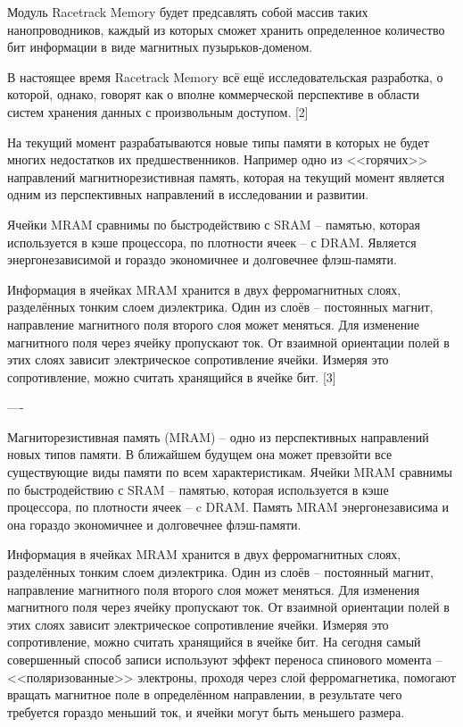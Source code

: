 Модуль Racetrack Memory будет предсавлять собой массив таких 
нанопроводников, каждый из которых сможет хранить определенное количество 
бит информации в виде магнитных пузырьков-доменом. 

В настоящее время Racetrack Memory всё ещё исследовательская разработка, 
о которой, однако, говорят как о вполне коммерческой перспективе в области 
систем хранения данных с произвольным доступом. [2]

На текущий момент разрабатываются новые типы памяти в которых не будет 
многих недостатков их предшественников. Например одно из <<горячих>> 
направлений магнитнорезистивная память, которая на текущий момент 
является одним из перспективных направлений в исследовании и развитии.

Ячейки MRAM сравнимы по быстродействию с SRAM -- памятью, которая 
используется в кэше процессора, по плотности ячеек -- с DRAM. Является 
энергонезависимой и гораздо экономичнее и долговечнее флэш-памяти.

Информация в ячейках MRAM хранится в двух ферромагнитных слоях, 
разделённых тонким слоем диэлектрика. Один из слоёв -- постоянных магнит, 
направление магнитного поля второго слоя может меняться. Для изменение 
магнитного поля через ячейку пропускают ток. От взаимной ориентации полей 
в этих слоях зависит электрическое сопротивление ячейки. Измеряя это 
сопротивление, можно считать хранящийся в ячейке бит. [3]

----

Магниторезистивная память (MRAM) -- одно из перспективных направлений 
новых типов памяти. В ближайшем будущем она может превзойти все 
существующие виды памяти по всем характеристикам. Ячейки MRAM сравнимы по 
быстродействию с SRAM -- памятью, которая используется в кэше процессора, 
по плотности ячеек -- c DRAM. Память MRAM энергонезависима и она гораздо 
экономичнее и долговечнее флэш-памяти.

Информация в ячейках MRAM хранится в двух ферромагнитных слоях, 
разделённых тонким слоем диэлектрика. Один из слоёв -- постоянный магнит, 
направление магнитного поля второго слоя может меняться. Для изменения 
магнитного поля через ячейку пропускают ток. От взаимной ориентации полей в 
этих слоях зависит электрическое сопротивление ячейки. Измеряя это 
сопротивление, можно считать хранящийся в ячейке бит. На сегодня самый 
совершенный способ записи используют эффект переноса спинового момента -- 
<<поляризованные>> электроны, проходя через слой ферромагнетика, помогают 
вращать магнитное поле в определённом направлении, в результате чего 
требуется гораздо меньший ток, и ячейки могут быть меньшего размера.

